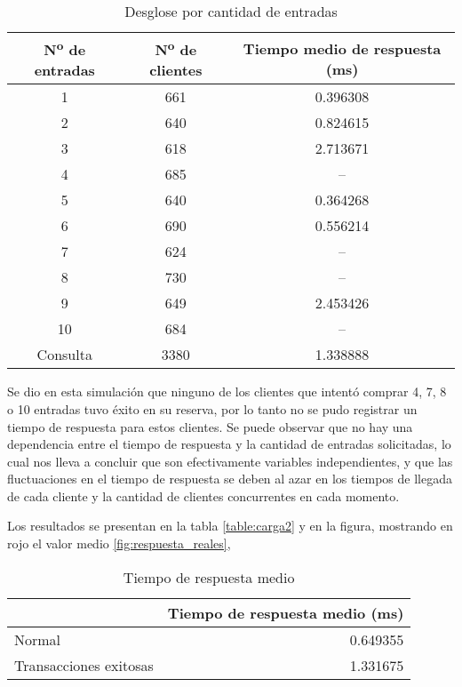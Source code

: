 \begin{table}[H]
\centering
\begin{tabular}{ccc}
	N\textsuperscript{o} de entradas & N\textsuperscript{o} de clientes & Tiempo medio de respuesta (ms)  \\
\hline
1                 & 661 &            0.396308 \\
2                 & 640 &            0.824615 \\
3                 & 618 &            2.713671 \\
4                 & 685 &            -- \\
5                 & 640 &            0.364268 \\
6                 & 690 &            0.556214 \\
7                 & 624 &            -- \\
8                 & 730 &            -- \\
9                 & 649 &            2.453426 \\
10                & 684 &            -- \\
Consulta                 & 3380 &           1.338888 \\
\end{tabular}
\caption{Desglose por cantidad de entradas}
\label{table:reales}
\end{table}

Se dio en esta simulación que ninguno de los clientes que intentó comprar 4, 7, 8 o 10 entradas tuvo éxito en su reserva,
por lo tanto no se pudo registrar un tiempo de respuesta para estos clientes.
Se puede observar que no hay una dependencia entre el tiempo de respuesta y la cantidad de entradas solicitadas, lo cual
nos lleva a concluir que son efectivamente variables independientes, y que las fluctuaciones en el tiempo de respuesta se deben
al azar en los tiempos de llegada de cada cliente y la cantidad de clientes concurrentes en cada momento.

Los resultados se presentan en la tabla \ref{table:carga2} y en la figura, mostrando en rojo el valor medio \ref{fig:respuesta_reales},

\begin{table}[H]
\centering
\begin{tabular}{l|r}
	{} &  Tiempo de respuesta medio (ms) \\
	\hline
Normal & 0.649355 \\
Transacciones exitosas  & 1.331675 \\
\end{tabular}
\caption{Tiempo de respuesta medio}
\label{table:reales2}
\end{table}


